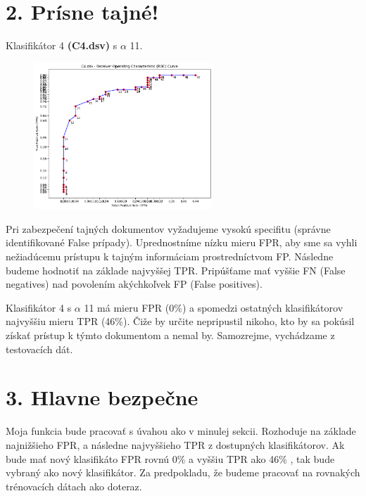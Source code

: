 \documentclass[a4paper, 11pt]{report}
\begin{document}
    \section*{2. Prísne tajné!}\label{sec:top-secret}

    Klasifikátor 4 \textbf{(C4.dsv)} s $\alpha$ 11.

    \begin{figure} %
        \centering
        \includegraphics[width=0.6\textwidth]{images/second} %
        \label{fig:c2-roc}
    \end{figure}

    Pri zabezpečení tajných dokumentov vyžadujeme vysokú specifitu (správne identifikované False prípady). Uprednostníme
    nízku mieru FPR, aby sme sa vyhli nežiadúcemu prístupu k tajným informáciam prostredníctvom FP. Následne budeme
    hodnotiť na základe najvyššej TPR. Pripúšťame mať vyššie FN (False negatives) nad povolením akýchkoľvek FP (False positives).

    Klasifikátor 4 s $\alpha$ 11 má mieru FPR (0\%) a spomedzi ostatných klasifikátorov najvyššiu mieru TPR (46\%).
    Čiže by určite nepripustil nikoho, kto by sa pokúsil získať prístup k týmto dokumentom a nemal by. Samozrejme,
    vychádzame z testovacích dát.

    \section*{3. Hlavne bezpečne}\label{sec:mainly-securely}

    Moja funkcia bude pracovať s úvahou ako v minulej sekcii. Rozhoduje na základe najnižšieho FPR, a následne najvyššieho TPR z dostupných klasifikátorov.
    Ak bude mať nový klasifikáto FPR rovnú 0\% a vyššiu TPR ako 46\% , tak bude vybraný ako nový klasifikátor. Za predpokladu, že
    budeme pracovať na rovnakých trénovacích dátach ako doteraz.
\end{document}
